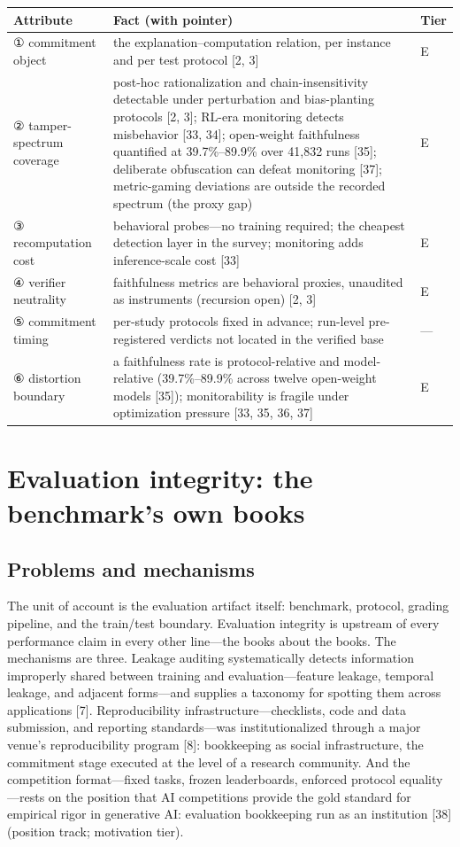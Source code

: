 \documentclass[11pt]{article}
\begin{document}
\noindent\begin{tabularx}{\textwidth}{@{}>{\raggedright\arraybackslash}p{} >{\raggedright\arraybackslash}X >{\raggedright\arraybackslash}p{}@{}}
\toprule
\textbf{\textbf{Attribute}} & \textbf{\textbf{Fact (with pointer)}} & \textbf{\textbf{Tier}} \\
\midrule
① commitment object & the explanation–computation relation, per instance and per test protocol [2, 3] & E \\
② tamper-spectrum coverage & post-hoc rationalization and chain-insensitivity detectable under perturbation and bias-planting protocols [2, 3]; RL-era monitoring detects misbehavior [33, 34]; open-weight faithfulness quantified at 39.7\%–89.9\% over 41,832 runs [35]; deliberate obfuscation can defeat monitoring [37]; metric-gaming deviations are outside the recorded spectrum (the proxy gap) & E \\
③ recomputation cost & behavioral probes—no training required; the cheapest detection layer in the survey; monitoring adds inference-scale cost [33] & E \\
④ verifier neutrality & faithfulness metrics are behavioral proxies, unaudited as instruments (recursion open) [2, 3] & E \\
⑤ commitment timing & per-study protocols fixed in advance; run-level pre-registered verdicts not located in the verified base & — \\
⑥ distortion boundary & a faithfulness rate is protocol-relative and model-relative (39.7\%–89.9\% across twelve open-weight models [35]); monitorability is fragile under optimization pressure [33, 35, 36, 37] & E \\
\bottomrule
\end{tabularx}
\endgroup
\section{Evaluation integrity: the benchmark's own books}
\label{sec:6}
\subsection{Problems and mechanisms}
\noindent The unit of account is the evaluation artifact itself: benchmark, protocol, grading pipeline, and the train/test boundary. Evaluation integrity is upstream of every performance claim in every other line—the books about the books. The mechanisms are three. Leakage auditing systematically detects information improperly shared between training and evaluation—feature leakage, temporal leakage, and adjacent forms—and supplies a taxonomy for spotting them across applications [7]. Reproducibility infrastructure—checklists, code and data submission, and reporting standards—was institutionalized through a major venue's reproducibility program [8]: bookkeeping as social infrastructure, the commitment stage executed at the level of a research community. And the competition format—fixed tasks, frozen leaderboards, enforced protocol equality—rests on the position that AI competitions provide the gold standard for empirical rigor in generative AI: evaluation bookkeeping run as an institution [38] (position track; motivation tier).\par
\end{document}
